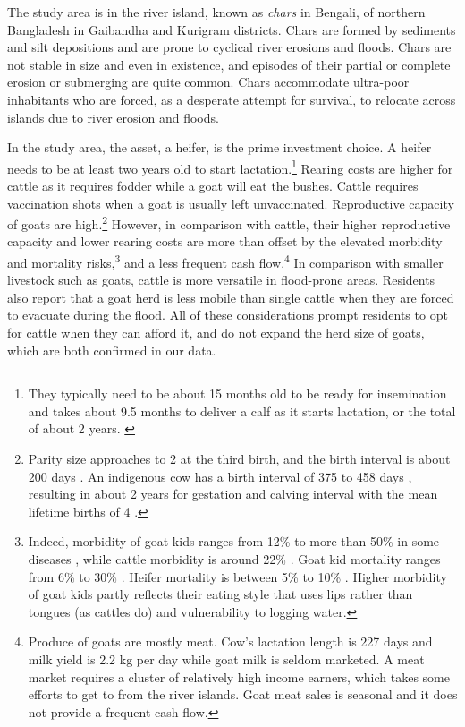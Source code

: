 	The study area is in the river island, known as \textit{chars} in Bengali, of northern Bangladesh in Gaibandha and Kurigram districts. Chars are formed by sediments and silt depositions and are prone to cyclical river erosions and floods. Chars are not stable in size and even in existence, and episodes of their partial or complete erosion or submerging are quite common. Chars accommodate ultra-poor inhabitants who are forced, as a desperate attempt for survival, to relocate across islands due to river erosion and floods.

	In the study area, the asset, a heifer, is the prime investment choice. A heifer needs to be at least two years old to start lactation.\footnote{They typically need to be about 15 months old to be ready for insemination and takes about 9.5 months to deliver a calf as it starts lactation, or the total of about 2 years. \label{heifer2years}} Rearing costs are higher for cattle as it requires fodder while a goat will eat the bushes. Cattle requires vaccination shots when a goat is usually left unvaccinated. Reproductive capacity of goats are high.\footnote{Parity size approaches to 2 at the third birth, and the birth interval is about 200 days \citep{Hasan2014goat}. An indigenous cow has a birth interval of 375 to 458 days \citep{Hasan2018}, resulting in about 2 years for gestation and calving interval \citep{Habib2012} with the mean lifetime births of 4 \citep[][Table 1]{Hasan2018}. } However, in comparison with cattle, their higher reproductive capacity and lower rearing costs are more than offset by the elevated morbidity and mortality risks,\footnote{Indeed, morbidity of goat kids ranges from 12\% \citep{Mahmud2015} to more than 50\% in some diseases \citep[][Table 5]{Nandi2011}, while cattle morbidity is around 22\% \citep{Bangar2013}. Goat kid mortality ranges from 6\% \citep{Mahmud2015} to 30\% \citep[][Table 5]{Paul2014} \citep{Ershaduzzaman2007}. Heifer mortality is between 5\% \citep[][p.332R]{Hossain2014} to 10\% \citep{Alauddin2018}. Higher morbidity of goat kids partly reflects their eating style that uses lips rather than tongues (as cattles do) and vulnerability to logging water. } and a less frequent cash flow.\footnote{Produce of goats are mostly meat. Cow's lactation length is 227 days and milk yield is 2.2 kg per day \citep{Rokonuzzaman2009} while goat milk is seldom marketed.  A meat market requires a cluster of relatively high income earners, which takes some efforts to get to from the river islands. Goat meat sales is seasonal and it does not provide a frequent cash flow. } In comparison with smaller livestock such as goats, cattle is more versatile in flood-prone areas. Residents also report that a goat herd is less mobile than single cattle when they are forced to evacuate during the flood. All of these considerations prompt residents to opt for cattle when they can afford it, and do not expand the herd size of goats, which are both confirmed in our data.

